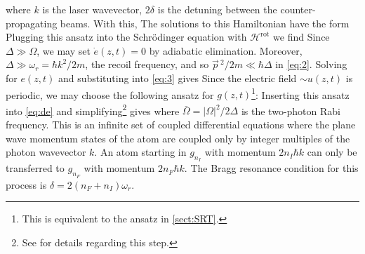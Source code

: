 \documentclass[reprint,
nofootinbib,
amsmath,amssymb,
aps]{revtex4-1}
\newcommand{\p}{\partial}
\newcommand{\f}[2]{\frac{#1}{#2}}
\newcommand{\lp}{\left(}
\newcommand{\rp}{\right)}
\newcommand{\lb}{\left[}
\newcommand{\rb}{\right]}
\begin{document}
where $k$ is the laser wavevector, $2\delta$ is the detuning between the counter-propagating beams. With this, 
The solutions to this Hamiltonian have the form 
Plugging this ansatz into the Schr\"{o}dinger equation with $\mathcal{H}^\text{rot}$ we find 
Since $\Delta \gg \Omega$, we may set $\dot{e}(z,t) = 0$ by adiabatic elimination. Moreover, $\Delta \gg \omega_r = \hbar k^2/2m$, the recoil frequency, and so $\vec{p}\,^2/2m\ll \hbar \Delta$ in \eqref{eq:2}. Solving for $e(z,t)$ and substituting into \eqref{eq:3} gives
Since the electric field $\sim u(z,t)$ is periodic, we may choose the following ansatz for $g(z,t)$\footnote{This is equivalent to the ansatz in \ref{sect:SRT}.}:
Inserting this ansatz into \eqref{eq:de} and simplifying\footnote{See \cite{estey2016precision} for details regarding this step.} gives
where $\bar{\Omega} = |\Omega|^2/2\Delta$ is the two-photon Rabi frequency. This is an infinite set of coupled differential equations where the plane wave momentum states of the atom are coupled only by integer multiples of the photon wavevector $k$. An atom starting in $g_{n_I}$ with momentum $2n_I \hbar k$ can only be transferred to $g_{n_F}$ with momentum $2n_F \hbar k$. The Bragg resonance condition for this process is $\delta = 2(n_F + n_I)\omega_r$. 
\end{document}
